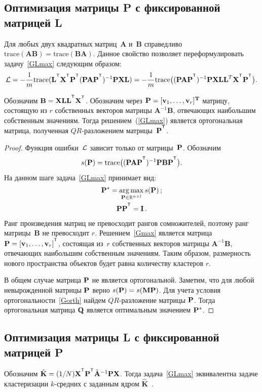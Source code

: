 \subsection*{Оптимизация матрицы P с фиксированной матрицей L}
Для любых двух квадратных матриц~$\mathbf{A}$ и~$\mathbf{B}$ справедливо $\text{trace}(\mathbf{AB}) = \text{trace}(\mathbf{BA})$.
Данное свойство позволяет переформулировать задачу~\eqref{GLmax} следующим образом:
\[
\cL = -\frac{1}{m} \text{trace} (\mathbf{L}^{\T} \bX^{\T} \bP^{\T} (\bP \mathbf{A} \bP^{\T})^{-1} \bP \bX \mathbf{L}) = -\frac{1}{m} \text{trace} \bigl((\bP \mathbf{A} \bP^{\T})^{-1} \bP \bX \mathbf{LL}^{T} \bX^{\T} \bP^{\T}\bigr).
\]
\begin{theorem}
	Обозначим $\mathbf{B} = \bX \mathbf{LL}^{\T} \bX^{\T}$.
	Обозначим через $\mathbf{P} = [\mathbf{v}_1, \ldots, \mathbf{v}_r]^{\mathbf{T}}$ матрицу, состоящую из $r$ собственных векторов матрицы $\mathbf{A}^{-1}\mathbf{B}$, отвечающих наибольшим собственным значениям.
	Тогда решением~(\ref{GLmax}) является ортогональная матрица, полученная $QR$-разложением матрицы~$\bP^{\T}$.
\end{theorem}
\begin{proof}
Функция ошибки~$\mathcal{L}$ зависит только от матрицы~$\mathbf{P}$. Обозначим
\[
s(\bP) = \text{trace} \bigl((\bP \mathbf{A} \bP^{\T})^{-1} \bP \mathbf{B} \bP^{\T}\bigr).
\]
На данном шаге задача~\eqref{GLmax} принимает вид:
\begin{gather}
\label{Gmax}
\bP^* = \argmax_{\bP \in \bbR^{n \times l}} s(\bP)\,; \\
\label{Gorth}
\bP \bP^{\T} = \mathbf{I}\,.
\end{gather}
Ранг произведения матриц не превосходит рангов сомножителей, поэтому ранг матрицы~$\mathbf{B}$ не превосходит $r$.
Решением~\eqref{Gmax} является матрица $\bP = [\mathbf{v}_1, \ldots, \mathbf{v}_r]^{\T}$, состоящая
из~$r$ собственных векторов матрицы $\mathbf{A}^{-1}\mathbf{B}$, отвечающих наибольшим собственным значениям.
Таким образом, размерность нового пространства объектов будет равна количеству кластеров $r$.

В общем случае матрица $\mathbf{P}$ не является ортогональной.
Заметим, что для любой невырожденной матрицы $\mathbf{P}$ верно $s(\mathbf{P}) = s(\mathbf{M} \mathbf{P})$.
Для учета условия ортогональности~\eqref{Gorth} найдем $QR$-разложение матрицы $\mathbf{P}$.
Тогда ортогональная матрица $\mathbf{Q}$ является оптимальным значением $\mathbf{P}^*$.
\end{proof}

\subsection*{Оптимизация матрицы L с фиксированной матрицей P}
\begin{theorem}
	Обозначим $\hat{\mathbf{K}} = (1/N)\bX^{\T} \bP^{\T} \hat{\mathbf{A}}^{-1} \bP \bX$.
	Тогда задача~\eqref{GLmax} эквивалентна задаче кластеризации $k$-средних с заданным ядром $\hat{\mathbf{K}}$~\cite{shawe2004kernel}.
\end{theorem}

